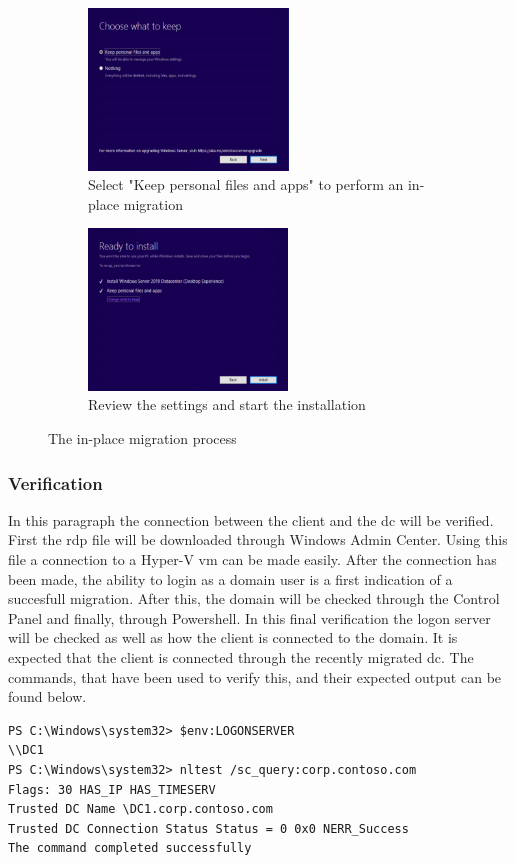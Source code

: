 \begin{figure}[h]\ContinuedFloat
	\begin{subfigure}{0.5\textwidth}
		\captionsetup{width=0.8\linewidth}
		\includegraphics[width=0.9\linewidth,height=4.3cm]{img/Methodologie/InPlace4.png} 
		\centering
		\caption{Select "Keep personal files and apps" to perform an in-place migration}
		\label{fig:inplace6}
	\end{subfigure}
	\begin{subfigure}{0.5\textwidth}
		\captionsetup{width=0.8\linewidth}
		\includegraphics[width=0.9\linewidth,height=4.3cm]{img/Methodologie/InPlace5.png}
		\centering
		\caption{Review the settings and start the installation}
		\label{fig:inplace7}
	\end{subfigure}
	\caption{The in-place migration process}
	\label{fig:inplace}
\end{figure}
\subsubsection{Verification}
In this paragraph the connection between the client and the \acrshort{dc} will be verified. First the \acrfull{rdp} file will be downloaded through Windows Admin Center. Using this file a connection to a Hyper-V \acrshort{vm} can be made easily. After the connection has been made, the ability to login as a domain user is a first indication of a succesfull migration. After this, the domain will be checked through the Control Panel and finally, through Powershell. In this final verification the logon server will be checked as well as how the client is connected to the domain. It is expected that the client is connected through the recently migrated \acrshort{dc}.
The commands, that have been used to verify this, and their expected output can be found below.
\begin{lstlisting}[breaklines]
PS C:\Windows\system32> $env:LOGONSERVER
\\DC1
PS C:\Windows\system32> nltest /sc_query:corp.contoso.com
Flags: 30 HAS_IP HAS_TIMESERV
Trusted DC Name \DC1.corp.contoso.com
Trusted DC Connection Status Status = 0 0x0 NERR_Success
The command completed successfully
\end{lstlisting}

